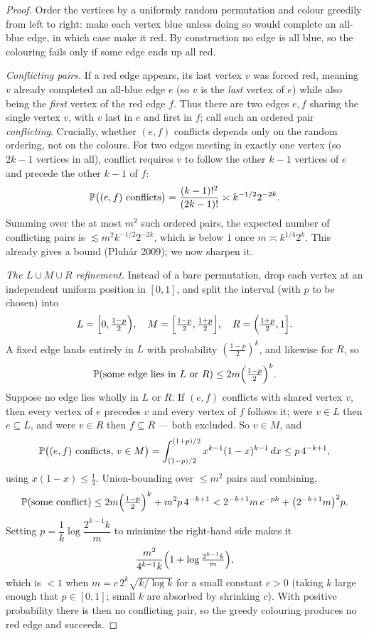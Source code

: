\begin{proof}
Order the vertices by a uniformly random permutation and colour greedily from
left to right: make each vertex blue unless doing so would complete an
all-blue edge, in which case make it red. By construction no edge is all blue,
so the colouring fails only if some edge ends up all red.

\smallskip\noindent\emph{Conflicting pairs.} If a red edge appears, its last
vertex $v$ was forced red, meaning $v$ already completed an all-blue edge $e$
(so $v$ is the \emph{last} vertex of $e$) while also being the \emph{first}
vertex of the red edge $f$. Thus there are two edges $e,f$ sharing the single
vertex $v$, with $v$ last in $e$ and first in $f$; call such an ordered pair
\emph{conflicting}. Crucially, whether $(e,f)$ conflicts depends only on the
random ordering, not on the colours. For two edges meeting in exactly one
vertex (so $2k-1$ vertices in all), conflict requires $v$ to follow the other
$k-1$ vertices of $e$ and precede the other $k-1$ of $f$:
\[
  \mathbb{P}\bigl((e,f)\text{ conflicts}\bigr)=\frac{(k-1)!^2}{(2k-1)!}
  \asymp k^{-1/2}2^{-2k}.
\]
Summing over the at most $m^2$ such ordered pairs, the expected number of
conflicting pairs is $\lesssim m^2 k^{-1/2}2^{-2k}$, which is below $1$ once
$m\asymp k^{1/4}2^k$. This already gives a bound (Pluh\'ar 2009); we now sharpen
it.

\smallskip\noindent\emph{The $L\cup M\cup R$ refinement.} Instead of a bare
permutation, drop each vertex at an independent uniform position in $[0,1]$, and
split the interval (with $p$ to be chosen) into
\[
  L=\Bigl[0,\tfrac{1-p}2\Bigr),\quad
  M=\Bigl[\tfrac{1-p}2,\tfrac{1+p}2\Bigr],\quad
  R=\Bigl(\tfrac{1+p}2,1\Bigr].
\]
A fixed edge lands entirely in $L$ with probability $(\tfrac{1-p}2)^k$, and
likewise for $R$, so
\[
  \mathbb{P}(\text{some edge lies in }L\text{ or }R)\le 2m\Bigl(\tfrac{1-p}2\Bigr)^k.
\]
Suppose no edge lies wholly in $L$ or $R$. If $(e,f)$ conflicts with shared
vertex $v$, then every vertex of $e$ precedes $v$ and every vertex of $f$
follows it; were $v\in L$ then $e\subseteq L$, and were $v\in R$ then
$f\subseteq R$ --- both excluded. So $v\in M$, and
\[
  \mathbb{P}\bigl((e,f)\text{ conflicts, }v\in M\bigr)
  =\int_{(1-p)/2}^{(1+p)/2}x^{k-1}(1-x)^{k-1}\,dx
  \le p\,4^{-k+1},
\]
using $x(1-x)\le\tfrac14$. Union-bounding over $\le m^2$ pairs and combining,
\[
  \mathbb{P}(\text{some conflict})
  \le 2m\Bigl(\tfrac{1-p}2\Bigr)^k + m^2 p\,4^{-k+1}
  < 2^{-k+1}m\,e^{-pk} + \bigl(2^{-k+1}m\bigr)^2 p.
\]
Setting $p=\dfrac{1}{k}\log\!\dfrac{2^{k-1}k}{m}$ to minimize the right-hand
side makes it
\[
  \frac{m^2}{4^{k-1}k}\Bigl(1+\log\tfrac{2^{k-1}k}{m}\Bigr),
\]
which is $<1$ when $m=c\,2^k\sqrt{k/\log k}$ for a small constant $c>0$ (taking
$k$ large enough that $p\in[0,1]$; small $k$ are absorbed by shrinking $c$).
With positive probability there is then no conflicting pair, so the greedy
colouring produces no red edge and succeeds.
\end{proof}

